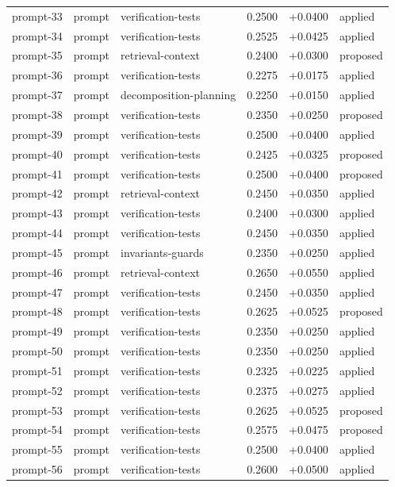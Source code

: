 \begin{center}
\begin{longtable}{llp{5.2cm}rrl}
prompt-33 & prompt & verification-tests & 0.2500 & +0.0400 & applied \\
prompt-34 & prompt & verification-tests & 0.2525 & +0.0425 & applied \\
prompt-35 & prompt & retrieval-context & 0.2400 & +0.0300 & proposed \\
prompt-36 & prompt & verification-tests & 0.2275 & +0.0175 & applied \\
prompt-37 & prompt & decomposition-planning & 0.2250 & +0.0150 & applied \\
prompt-38 & prompt & verification-tests & 0.2350 & +0.0250 & proposed \\
prompt-39 & prompt & verification-tests & 0.2500 & +0.0400 & applied \\
prompt-40 & prompt & verification-tests & 0.2425 & +0.0325 & proposed \\
prompt-41 & prompt & verification-tests & 0.2500 & +0.0400 & proposed \\
prompt-42 & prompt & retrieval-context & 0.2450 & +0.0350 & applied \\
prompt-43 & prompt & verification-tests & 0.2400 & +0.0300 & applied \\
prompt-44 & prompt & verification-tests & 0.2450 & +0.0350 & applied \\
prompt-45 & prompt & invariants-guards & 0.2350 & +0.0250 & applied \\
prompt-46 & prompt & retrieval-context & 0.2650 & +0.0550 & applied \\
prompt-47 & prompt & verification-tests & 0.2450 & +0.0350 & applied \\
prompt-48 & prompt & verification-tests & 0.2625 & +0.0525 & proposed \\
prompt-49 & prompt & verification-tests & 0.2350 & +0.0250 & applied \\
prompt-50 & prompt & verification-tests & 0.2350 & +0.0250 & applied \\
prompt-51 & prompt & verification-tests & 0.2325 & +0.0225 & applied \\
prompt-52 & prompt & verification-tests & 0.2375 & +0.0275 & applied \\
prompt-53 & prompt & verification-tests & 0.2625 & +0.0525 & proposed \\
prompt-54 & prompt & verification-tests & 0.2575 & +0.0475 & proposed \\
prompt-55 & prompt & verification-tests & 0.2500 & +0.0400 & applied \\
prompt-56 & prompt & verification-tests & 0.2600 & +0.0500 & applied \\

\end{longtable}
\end{center}
